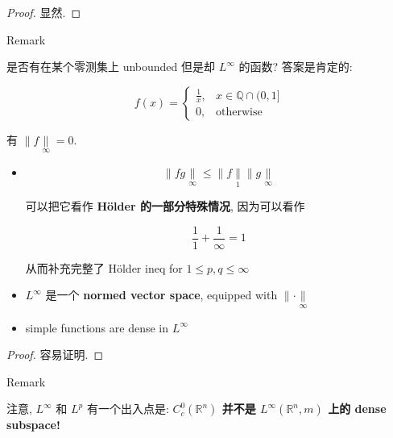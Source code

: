 \documentclass{qlnotes-export}
\begin{document}
\begin{proof}

显然.

\end{proof}

\begin{qlremark}{Remark}

是否有在某个零测集上 unbounded 但是却 \(L^{\infty}\) 的函数? 答案是肯定的:

\[f(x) = \left\{ \begin{matrix}
{\frac{1}{x},} & {x \in {\mathbb{Q}} \cap (0,1\rbrack} \\
{0,} & \text{otherwise}
\end{matrix} \right.\]

有 \(\parallel f\underset{\infty}{\parallel} = 0\).

\end{qlremark}

\begin{theorem}\label{thm-09-l-p-space-and-inequalities-theorem-007}

\begin{itemize}
\item
  \[\parallel fg\underset{\infty}{\parallel} \leq \parallel f\underset{1}{\parallel} \parallel g\underset{\infty}{\parallel}\]

  可以把它看作 \textbf{Hölder 的一部分特殊情况}, 因为可以看作

  \[\frac{1}{1} + \frac{1}{\infty} = 1\]

  从而补充完整了 Hölder ineq for \(1 \leq p,q \leq \infty\)
\item
  \(L^{\infty}\) 是一个 \textbf{normed vector space}, equipped with \(\parallel \cdot \underset{\infty}{\parallel}\)
\item
  simple functions are dense in \(L^{\infty}\)
\end{itemize}

\end{theorem}

\begin{proof}

容易证明.

\end{proof}

\begin{qlremark}{Remark}

注意, \(L^{\infty}\) 和 \(L^{p}\) 有一个出入点是: \textbf{\(C_{c}^{0}({\mathbb{R}}^{n})\) 并不是 \(L^{\infty}({\mathbb{R}}^{n},m)\) 上的 dense subspace!}\\

\end{qlremark}
\end{document}

